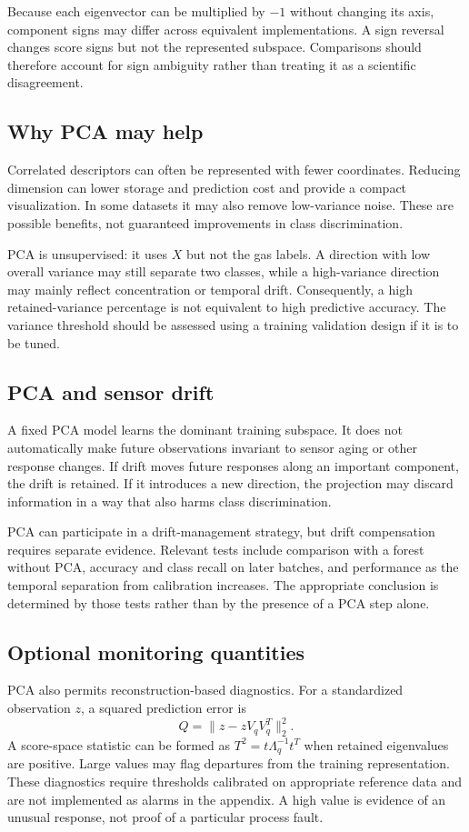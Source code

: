 \documentclass[11pt,a4paper]{article}
\begin{document}
Because each eigenvector can be multiplied by $-1$ without changing its axis, component signs may differ across equivalent implementations. A sign reversal changes score signs but not the represented subspace. Comparisons should therefore account for sign ambiguity rather than treating it as a scientific disagreement.

\subsection{Why PCA may help}
Correlated descriptors can often be represented with fewer coordinates. Reducing dimension can lower storage and prediction cost and provide a compact visualization. In some datasets it may also remove low-variance noise. These are possible benefits, not guaranteed improvements in class discrimination.

PCA is unsupervised: it uses $X$ but not the gas labels. A direction with low overall variance may still separate two classes, while a high-variance direction may mainly reflect concentration or temporal drift. Consequently, a high retained-variance percentage is not equivalent to high predictive accuracy. The variance threshold should be assessed using a training validation design if it is to be tuned.

\subsection{PCA and sensor drift}
A fixed PCA model learns the dominant training subspace. It does not automatically make future observations invariant to sensor aging or other response changes. If drift moves future responses along an important component, the drift is retained. If it introduces a new direction, the projection may discard information in a way that also harms class discrimination.

PCA can participate in a drift-management strategy, but drift compensation requires separate evidence. Relevant tests include comparison with a forest without PCA, accuracy and class recall on later batches, and performance as the temporal separation from calibration increases. The appropriate conclusion is determined by those tests rather than by the presence of a PCA step alone.

\subsection{Optional monitoring quantities}
PCA also permits reconstruction-based diagnostics. For a standardized observation $z$, a squared prediction error is
\begin{equation}
Q=\|z-zV_qV_q^T\|_2^2.
\end{equation}
A score-space statistic can be formed as $T^2=t\Lambda_q^{-1}t^T$ when retained eigenvalues are positive. Large values may flag departures from the training representation. These diagnostics require thresholds calibrated on appropriate reference data and are not implemented as alarms in the appendix. A high value is evidence of an unusual response, not proof of a particular process fault.
\end{document}

